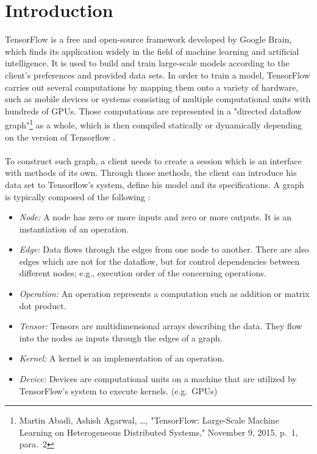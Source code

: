 \documentclass[ieeetran]{article}
\begin{document}
\section{Introduction} %
\label{sec:introduction}
TensorFlow is a free and open-source framework developed by Google Brain, which finds its application widely in the field of machine learning and artificial intelligence. It is used to build and train large-scale models according to the client's preferences and provided data sets. In order to train a model, TensorFlow carries out several computations by mapping them onto a variety of hardware, such as mobile devices or systems consisting of multiple computational units with hundreds of GPUs. Those computations are represented in a "directed dataflow graph"\footnote{Martin Abadi, Ashish Agarwal, \ldots, "TensorFlow: Large-Scale Machine Learning on Heterogeneous Distributed Systems," November 9, 2015, p.\ 1, para.\ 2} as a whole, which is then compiled statically or dynamically depending on the version of Tensorflow \cite{first}. 
\\ \\To construct such graph, a client needs to create a session which is an interface with methods of its own. Through those methods, the client can introduce his data set to Tensorflow's system, define his model and its specifications. A graph is typically composed of the following \cite{first}:
\begin{itemize}
  \item \textit{Node:} A node has zero or more inputs and zero or more outputs. It is an instantiation of an operation.
\item \textit{Edge:} Data flows through the edges from one node to another. There are also edges which are not for the dataflow, but for control dependencies between different nodes; e.g., execution order of the concerning operations.
\item \textit{Operation:} An operation represents a computation such as addition or matrix dot product.
\item \textit{Tensor:} Tensors are multidimensional arrays describing the data. They flow into the nodes as inputs through the edges of a graph.
\item \textit{Kernel:} A kernel is an implementation of an operation.
\item \textit{Device:} Devices are computational units on a machine that are utilized by TensorFlow's system to execute kernels. (e.g.\ GPUs)
\end{itemize}
\end{document}
